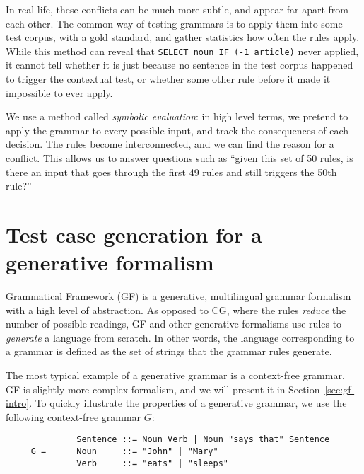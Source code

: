 In real life, these conflicts can be much more subtle, and appear far apart from each other. %
The common way of testing grammars is to apply them into some test corpus, with a gold standard, and gather statistics how often the rules apply. While this method can reveal that \texttt{SELECT noun IF (-1 article)} never applied, it cannot tell whether it is just because no sentence in the test corpus happened to trigger the contextual test, or whether some other rule before it made it impossible to ever apply.

We use a method called \emph{symbolic evaluation}: in high level terms, we pretend to apply the grammar to every possible input, and track the consequences of each decision.
The rules become interconnected, and we can find the reason for a conflict. This allows us to answer questions such as ``given this set of 50 rules, is there an input that goes through the first 49 rules and still triggers the 50th rule?''



\section{Test case generation for a generative formalism}

Grammatical Framework (GF) \cite{ranta2011gfbook} is a generative, multilingual grammar formalism with a high level of abstraction.
As opposed to CG, where the rules \emph{reduce} the number of possible readings, GF and other generative formalisms use rules to \emph{generate} a language from scratch. In other words, the language corresponding to a grammar is defined as the set of strings that the grammar rules generate.

The most typical example of a generative grammar is a context-free grammar. GF is slightly more complex formalism, and we will present it in Section~\ref{sec:gf-intro}. To quickly illustrate the properties of a generative grammar, we use the following context-free grammar $G$:

\begin{verbatim}
              Sentence ::= Noun Verb | Noun "says that" Sentence
     G =      Noun     ::= "John" | "Mary"
              Verb     ::= "eats" | "sleeps"
\end{verbatim}

